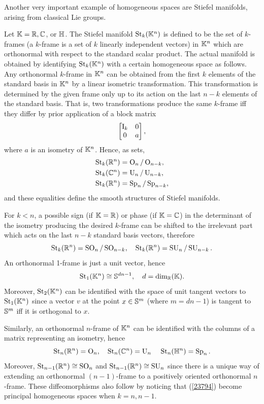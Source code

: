 Another very important example of homogeneous spaces are Stiefel manifolds, arising from classical Lie groups.

\begin{defn}\label{def stiefel manifolds}
    Let $\mathbb{K}=\mathbb{R},\mathbb{C}$, or $\mathbb{H}$. The Stiefel manifold $\operatorname{St}_k(\mathbb{K}^n)$ is defined to be the set of $k$-frames (a $k$-frame is a set of $k$ linearly independent vectors) in $\mathbb{K}^n$ which are orthonormal with respect to the standard scalar product. The actual manifold is obtained by identifying $\operatorname{St}_k(\mathbb{K}^n)$ with a certain homogeneous space as follows. Any orthonormal $k$-frame in $\mathbb{K}^n$ can be obtained from the first $k$ elements of the standard basis in $\mathbb{K}^n$ by a linear isometric transformation. This transformation is determined by the given frame only up to its action on the last $n-k$ elements of the standard basis. That is, two transformations produce the same $k$-frame iff they differ by prior application of a block matrix 
    \[\begin{bmatrix}
        \mathrm{I}_k&0\\0&a
    \end{bmatrix}, \]
    where $a$ is an isometry of $\mathbb{K}^n$. Hence, as sets,
    \begin{align}
        \operatorname{St}_k(\mathbb{R}^n)&=\operatorname{O}_n\slash \operatorname{O}_{n-k},\\
        \operatorname{St}_k(\mathbb{C}^n)&=\operatorname{U}_n\slash \operatorname{U}_{n-k},\\
        \operatorname{St}_k(\mathbb{R}^n)&=\operatorname{Sp}_n\slash \operatorname{Sp}_{n-k},
    \end{align}
    and these equalities define the smooth structures of Stiefel manifolds.
\end{defn}
\begin{rem}
    For $k<n$, a possible sign (if $\mathbb{K}=\mathbb{R}$) or phase (if $\mathbb{K}=\mathbb{C}$) in the determinant of the isometry producing the desired $k$-frame can be shifted to the irrelevant part which acts on the last $n-k$ standard basis vectors, therefore
    \[\operatorname{St}_k(\mathbb{R}^n)=\operatorname{SO}_n\slash \operatorname{SO}_{n-k},\quad \operatorname{St}_k(\mathbb{R}^n)=\operatorname{SU}_n\slash \operatorname{SU}_{n-k}.\label{23794}\]
    An orthonormal 1-frame is just a unit vector, hence
    \[\operatorname{St}_1(\mathbb{K}^n)\cong \mathbb{S}^{dn-1},\quad d=\dim_{\mathbb{R}}(\mathbb{K}).\]
    Moreover, $\operatorname{St}_2(\mathbb{K}^n)$ can be identified with the space of unit tangent vectors to $\operatorname{St}_1(\mathbb{K}^n)$  since a vector $v$ at the point $x\in \mathbb{S}^m$ (where $m=dn-1$) is tangent to $\mathbb{S}^m$ iff it is orthogonal to $x$.
    
    Similarly, an orthonormal $n$-frame of $\mathbb{K}^n$ can be identified with the columns of a matrix representing an isometry, hence
    \[\operatorname{St}_n(\mathbb{R}^n)=\operatorname{O}_n,\quad \operatorname{St}_n(\mathbb{C}^n)=\operatorname{U}_n\, \quad \operatorname{St}_n(\mathbb{H}^n)=\operatorname{Sp}_n.\]
    Moreover, $\operatorname{St}_{n-1}(\mathbb{R}^n)\cong \operatorname{SO}_n$ and $\operatorname{St}_{n-1}(\mathbb{R}^n)\cong \operatorname{SU}_n$ since there is a unique way of extending an orthonormal $(n-1)$-frame to a positively oriented orthonormal $n$-frame. These diffeomorphisms also follow by noticing that (\ref{23794}) become principal homogeneous spaces when $k=n,n-1$.
\end{rem}



